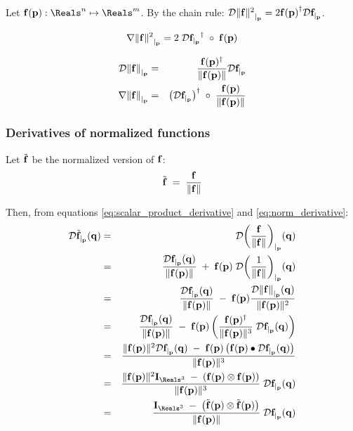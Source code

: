 Let $\f(\p) : \Reals^n \mapsto \Reals^m$.
By the chain rule:
${\mathcal{D}{\| {\mathbf f} \|^2}_{\mid_{{\mathbf p}}}}  =  2 {{\mathbf f}({\mathbf p})}^{\dagger} {\mathcal{D}{{\mathbf f}}_{\mid_{{\mathbf p}}}} $.

\begin{equation}
{\mathbf \nabla}{\| {\mathbf f}\|^2}_{\mid_{{\mathbf p}}}  =  2 \;{\mathcal{D}{{\mathbf f}}_{\mid_{{\mathbf p}}}}^\dagger \;\circ \;{\mathbf f}({\mathbf p})
\end{equation}

\begin{eqnarray}
\label{eq:norm_derivative}
{\mathcal{D}{\| {\mathbf f}\|}_{\mid_{{\mathbf p}}}}
& = &
{{{\mathbf f}({\mathbf p})^\dagger} \over {\| {\mathbf f}({\mathbf p}) \|}} {\mathcal{D}{{\mathbf f}}_{\mid_{{\mathbf p}}}}  \\
{\mathbf \nabla}{\| {\mathbf f} \|}_{\mid_{{\mathbf p}}}
& = &
\left({\mathcal{D}{{\mathbf f}}_{\mid_{{\mathbf p}}}}\right)^\dagger \;\circ \;{{{\mathbf f}({\mathbf p})} \over { \| {\mathbf f}({\mathbf p})  \|}}
\label{eq:norm_gradient}
\end{eqnarray}


\subsubsection{Derivatives of normalized functions}
\label{sec:Derivatives-of-normalized-functions}

Let $\tilde{{\mathbf f}}$ be the normalized version of ${\mathbf f}$:
\begin{equation}
\tilde{{\mathbf f}} \;= \;{{{\mathbf f}} \over {\| {\mathbf f}\|}}
\end{equation}

Then, from equations \ref{eq:scalar_product_derivative}
and \ref{eq:norm_derivative}:
\begin{eqnarray}
\Dc{\tilde{\f}}{\p}{\q}
& = &
\Dc{\left({\f \over {\| \f \|}}\right)}{\p}{\q}
\\
& = &
{\Dc{\f}{\p}{\q} \over {\| \f(\p) \|}}
\; + \;
\f(\p) \; \Dc{\left({1 \over {\| \f \|}}\right)}{\p}{\q} \nonumber \\
& = &
{\Dc{\f}{\p}{\q} \over {\| \f(\p) \|}}
\; - \;
\f(\p) {{\Dc{\| \f \|}{\p}{\q}} \over {\|\f(\p)\|^2}} \nonumber \\
& = &
{\Dc{\f}{\p}{\q} \over {\| \f(\p) \|}}
\; - \;
\f(\p) \left( {{\f(\p)^\dagger} \over {\| \f(\p) \|^3}} \;\Dc{\f}{\p}{\q} \right) \nonumber \\
& = &
{\| \f(\p) \|^2 \Dc{\f}{\p}{\q}
\; - \;
\f(\p)\left( \f(\p) \bullet \Dc{\f}{\p}{\q} \right) }
\over {\| \f(\p) \|^3}  \nonumber \\
& = &
{{\| \f(\p) \|^2 \I_{\Reals^3} \;- \;\left( \f(\p) \otimes \f(\p) \right)  }
\over {\| \f(\p) \|^3} }
\;\Dc{\f}{\p}{\q} \nonumber \\
& = &
{{\I_{\Reals^3} \;- \;\left( \tilde{\f}(\p) \otimes \tilde{\f}(\p) \right)  }
\over {\| \f(\p) \|} }
\;\Dc{\f}{\p}{\q} \nonumber
\end{eqnarray}

